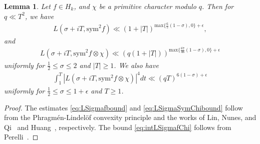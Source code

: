 \documentclass[10pt]{amsart}
\newtheorem{lemma}[theorem]{Lemma}
\begin{document}
\begin{lemma} \label{lem:LSymFChi}
    Let $f \in H_k$, and $\chi$ be a primitive character modulo $q$. Then for $q \ll T^2$, we have 
    \begin{align} \label{eq:LSigmafbound}
        L(\sigma+iT,\mathrm{sym}^2f) \ll (1+|T|)^{\mathrm{max} \{\frac{6}{5}(1-\sigma),0\} + \epsilon},
    \end{align}
    and \begin{align}\label{eq:LSigmaSymChibound}
        L(\sigma+iT,\mathrm{sym}^2f \otimes\chi) \ll (q(1+|T|))^{\mathrm{max} \{\frac{67}{46}(1-\sigma),0\} + \epsilon}
    \end{align}
    uniformly for $\frac{1}{2} \leq \sigma \leq 2$ and $|T| \geq 1$. We also have
    \begin{align}\label{eq:intLSigmafChi}
        \int_{1}^{T}|L(\sigma+iT,\mathrm{sym}^2f \otimes\chi)|^4dt \ll (qT)^{6(1-\sigma)+\epsilon}
    \end{align}
    uniformly for $\frac{1}{2} \leq \sigma \leq 1+\epsilon$ and $T \geq 1$.
 \end{lemma}

 \begin{proof}
     The estimates \eqref{eq:LSigmafbound} and \eqref{eq:LSigmaSymChibound} follow from the Phragm\'{en}-Lindel\"{o}f convexity principle and the works of Lin, Nunes, and Qi~\cite{Lin} and Huang~\cite{Huang}, respectively. The bound \eqref{eq:intLSigmafChi} follows from Perelli~\cite{Per}.
 \end{proof}
\end{document}
